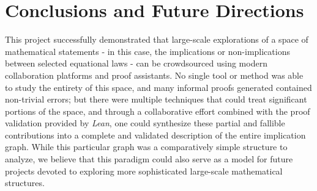 \section{Conclusions and Future Directions}

This project successfully demonstrated that large-scale explorations of a space of mathematical statements - in this case, the implications or non-implications between selected equational laws - can be crowdsourced using modern collaboration platforms and proof assistants.  No single tool or method was able to study the entirety of this space, and many informal proofs generated contained non-trivial errors; but there were multiple techniques that could treat significant portions of the space, and through a collaborative effort combined with the proof validation provided by \emph{Lean}, one could synthesize these partial and fallible contributions into a complete and validated description of the entire implication graph.  While this particular graph was a comparatively simple structure to analyze, we believe that this paradigm could also serve as a model for future projects devoted to exploring more sophisticated large-scale mathematical structures.

